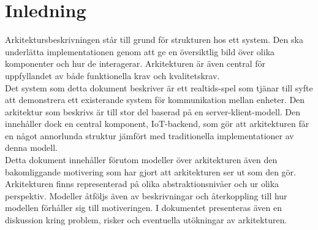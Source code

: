 \section{Inledning}
Arkitektursbeskrivningen står till grund för strukturen hos ett system. Den ska underlätta implementationen genom att ge en översiktlig bild över olika komponenter och hur de interagerar. Arkitekturen är även central för uppfyllandet av både funktionella krav och kvalitetskrav.\\

Det system som detta dokument beskriver är ett realtids-spel som tjänar till syfte att demonstrera ett existerande system för kommunikation mellan enheter. Den arkitektur som beskrivs är till stor del baserad på en server-klient-modell. Den innehåller dock en central komponent, IoT-backend, som gör att arkitekturen får en något annorlunda struktur jämfört med traditionella implementationer av denna modell.\\

Detta dokument innehåller förutom modeller över arkitekturen även den bakomliggande motivering som har gjort att arkitekturen ser ut som den gör. Arkitekturen finns representerad på olika abstraktionsnivåer och ur olika perspektiv. Modeller åtföljs även av beskrivningar och återkoppling till hur modellen förhåller sig till motiveringen. I dokumentet presenteras även en diskussion kring problem, risker och eventuella utökningar av arkitekturen.\\
